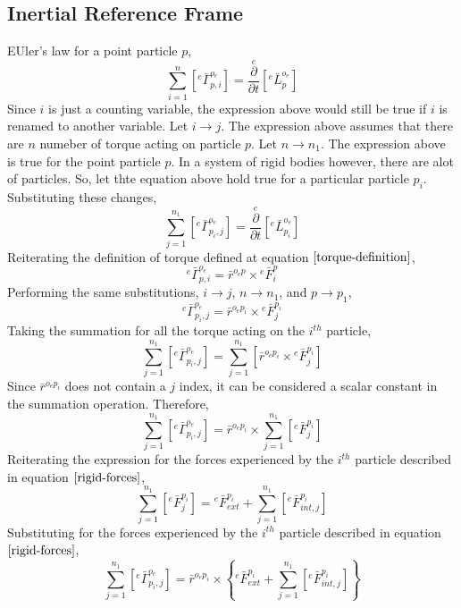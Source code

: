 \subsection{Inertial Reference Frame}
\begin{comment}
\end{comment}
EUler's law for a point particle $p$,
$$\sum^{n}_{i = 1}\left[{}^{e}\bar{\Gamma}^{o_{e}}_{p,i}\right] = \overset{e}{\frac{\partial}{\partial t}}\left[{}^{e}\bar{L}^{o_{e}}_{p}\right]$$
Since $i$ is just a counting variable, the expression above would still be true if $i$ is renamed to another variable. 
Let $i \to j$. 
The expression above assumes that there are $n$ numeber of torque acting on particle $p$. 
Let $n \to n_{1}$. 
The expression above is true for the point particle $p$. 
In a system of rigid bodies however, there are alot of particles. 
So, let thte equation above hold true for a particular particle $p_{i}$. 
Substituting these changes,
\begin{equation}
\sum^{n_{1}}_{j = 1}\left[{}^{e}\bar{\Gamma}^{o_{e}}_{p_{i},j}\right] = \overset{e}{\frac{\partial}{\partial t}}\left[{}^{e}\bar{L}^{o_{e}}_{p_{i}}\right]
\label{moments-rigid-1}
\end{equation}
Reiterating the definition of torque defined at equation $\ref{torque-definition}$,
$${}^{e}\bar{\Gamma}^{o_{e}}_{p,i} = \bar{r}^{o_{e}p}\times{}^{e}\bar{F}^{p}_{i}$$
Performing the same substitutions, $i \to j$, $n \to n_{1}$, and $p \to p_{1}$,
$${}^{e}\bar{\Gamma}^{o_{e}}_{p_{i},j} = \bar{r}^{o_{e}p_{i}}\times{}^{e}\bar{F}^{p_{i}}_{j}$$
Taking the summation for all the torque acting on the $i^{th}$ particle,
$$\sum^{n_{1}}_{j = 1}\left[{}^{e}\bar{\Gamma}^{o_{e}}_{p_{i},j}\right] = \sum^{n_{1}}_{j = 1}\left[\bar{r}^{o_{e}p_{i}}\times{}^{e}\bar{F}^{p_{i}}_{j}\right]$$
Since $\bar{r}^{o_{e}p_{i}}$ does not contain a $j$ index, it can be considered a scalar constant in the summation operation. 
Therefore,
$$\sum^{n_{1}}_{j = 1}\left[{}^{e}\bar{\Gamma}^{o_{e}}_{p_{i},j}\right] = \bar{r}^{o_{e}p_{i}}\times\sum^{n_{1}}_{j = 1}\left[{}^{e}\bar{F}^{p_{i}}_{j}\right]$$
Reiterating the expression for the forces experienced by the $i^{th}$ particle described in equation $\ref{rigid-forces}$,
$$\sum^{n_{1}}_{j = 1}\left[{}^{e}\bar{F}^{p_{i}}_{j}\right] = {}^{e}\bar{F}^{p_{i}}_{ext} + \sum^{n_{1}}_{j = 1}\left[{}^{e}\bar{F}^{p_{i}}_{int,j}\right]\label{rigid-forces}$$
Substituting for the forces experienced by the $i^{th}$ particle described in equation $\ref{rigid-forces}$,
$$\sum^{n_{1}}_{j = 1}\left[{}^{e}\bar{\Gamma}^{o_{e}}_{p_{i},j}\right] = \bar{r}^{o_{e}p_{i}}\times\left\{{}^{e}\bar{F}^{p_{i}}_{ext} + \sum^{n_{1}}_{j = 1}\left[{}^{e}\bar{F}^{p_{i}}_{int,j}\right]\right\}$$
